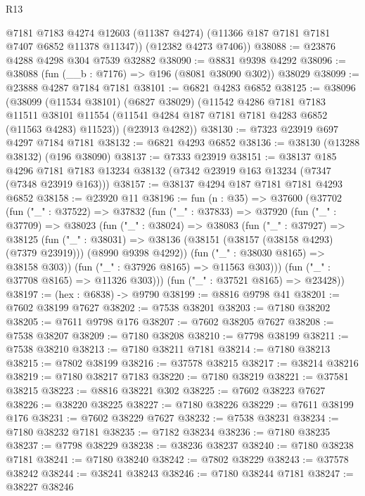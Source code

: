 \begin{lexlean}{R13}
\begin{coremodule}
        @7181
        @7183
        @4274
        @12603
        (@11387 @4274)
        (@11366 @187 @7181 @7181 @7407 @6852 @11378 @11347))
      (@12382 @4273 @7406))
@38088 := @23876 @4288 @4298 @304 @7539 @32882
@38090 := @8831 @9398 @4292
@38096 := @38088 (fun (__b : @7176) => @196 (@8081 @38090 @302)) @38029
@38099 := @23888 @4287 @7184 @7181
@38101 := @6821 @4283 @6852
@38125 := @38096
    (@38099
      (@11534 @38101)
      (@6827 @38029)
      (@11542
        @4286
        @7181
        @7183
        @11511
        @38101
        @11554
        (@11541 @4284 @187 @7181 @7181 @4283 @6852 (@11563 @4283) @11523))
      (@23913 @4282))
@38130 := @7323 @23919 @697 @4297 @7184 @7181
@38132 := @6821 @4293 @6852
@38136 := @38130 (@13288 @38132) (@196 @38090)
@38137 := @7333 @23919
@38151 := @38137
    @185
    @4296
    @7181
    @7183
    @13234
    @38132
    (@7342 @23919 @163 @13234 (@7347 (@7348 @23919 @163)))
@38157 := @38137 @4294 @187 @7181 @7181 @4293 @6852
@38158 := @23920 @11
@38196 := fun (n : @35) =>
  @37600
    (@37702
      (fun ("_" : @37522) =>
      @37832
        (fun ("_" : @37833) =>
        @37920
          (fun ("_" : @37709) =>
          @38023
            (fun ("_" : @38024) =>
            @38083
              (fun ("_" : @37927) =>
              @38125
                (fun ("_" : @38031) =>
                @38136 (@38151 (@38157 (@38158 @4293) (@7379 @23919))) (@8990 @9398 @4292))
                (fun ("_" : @38030 @8165) => @38158 @303))
              (fun ("_" : @37926 @8165) => @11563 @303)))
          (fun ("_" : @37708 @8165) => @11326 @303)))
      (fun ("_" : @37521 @8165) => @23428))
@38197 := (hex : @6838) -> @9790
@38199 := @8816 @9798 @41
@38201 := @7602 @38199 @7627
@38202 := @7538 @38201
@38203 := @7180 @38202
@38205 := @7611 @9798 @176
@38207 := @7602 @38205 @7627
@38208 := @7538 @38207
@38209 := @7180 @38208
@38210 := @7798 @38199
@38211 := @7538 @38210
@38213 := @7180 @38211 @7181
@38214 := @7180 @38213
@38215 := @7802 @38199
@38216 := @37578 @38215
@38217 := @38214 @38216
@38219 := @7180 @38217 @7183
@38220 := @7180 @38219
@38221 := @37581 @38215
@38223 := @8816 @38221 @302
@38225 := @7602 @38223 @7627
@38226 := @38220 @38225
@38227 := @7180 @38226
@38229 := @7611 @38199 @176
@38231 := @7602 @38229 @7627
@38232 := @7538 @38231
@38234 := @7180 @38232 @7181
@38235 := @7182 @38234
@38236 := @7180 @38235
@38237 := @7798 @38229
@38238 := @38236 @38237
@38240 := @7180 @38238 @7181
@38241 := @7180 @38240
@38242 := @7802 @38229
@38243 := @37578 @38242
@38244 := @38241 @38243
@38246 := @7180 @38244 @7181
@38247 := @38227 @38246

\end{coremodule}
\end{lexlean}
